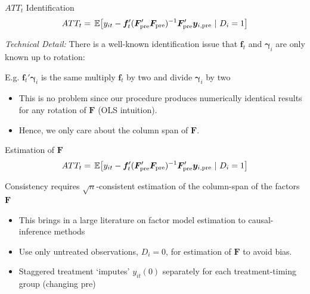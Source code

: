 \documentclass[aspectratio=169,t,11pt]{beamer}
\begin{document}
\begin{frame}{$ATT_t$ Identification}\label{slide:general_imputation_procedure}
  \vspace{-7.5mm}
  $$
    ATT_t = \expec{%
      y_{it} - \bm{f}_t' (\bm{F}_{\text{pre}}' \bm{F}_{\text{pre}})^{-1} \bm{F}_{\text{pre}}' \bm y_{i, \text{pre} } 
    }{D_i = 1} 
  $$

  \bigskip
  \emph{Technical Detail:}
  There is a well-known identification issue that $\bm{f}_t$ and $\bm{\gamma}_i$ are only known up to rotation: 
  

  \bigskip
  E.g. $\bm{f}_t' \bm{\gamma}_i$ is the same multiply $\bm{f}_t$ by two and divide $\bm{\gamma}_i$ by two

  \pause
  \begin{itemize}
    \item This is no problem since our procedure produces numerically identical results for any rotation of $\bm{F}$ (OLS intuition).
    \item Hence, we only care about the column span of $\bm{F}$. 
  \end{itemize}

\end{frame}

\begin{frame}{Estimation of $\bm{F}$}
  \vspace{-7.5mm}
  $$
    ATT_t = \expec{%
      y_{it} - \bm{f}_t' (\bm{F}_{\text{pre}}' \bm{F}_{\text{pre}})^{-1} \bm{F}_{\text{pre}}' \bm y_{i, \text{pre} } 
    }{D_i = 1} 
  $$

  \bigskip
  Consistency requires $\sqrt{n}$-consistent estimation of the column-span of the factors $\bm{F}$

  \smallskip
  \begin{itemize}
    \item This brings in a large literature on factor model estimation to causal-inference methods
    
    \pause 
    \item Use only untreated observations, $D_{i} = 0$, for estimation of $\bm{F}$ to avoid bias.
    \item Staggered treatment `imputes' $y_{it}(0)$ separately for each treatment-timing group (changing $\text{pre}$)
  \end{itemize}
\end{frame}
\end{document}
